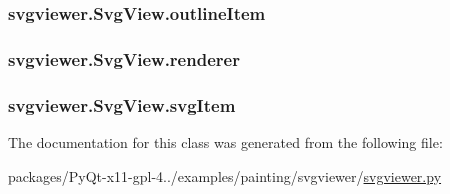 \subsubsection[{outline\+Item}]{\setlength{\rightskip}{0pt plus 5cm}svgviewer.\+Svg\+View.\+outline\+Item}\label{classsvgviewer_1_1SvgView_a85dfea1fa15b617175f3de8cd775ee19}
\hypertarget{classsvgviewer_1_1SvgView_a93df757fa1bb2c1f324c2c2e251dc291}{}
\subsubsection[{renderer}]{\setlength{\rightskip}{0pt plus 5cm}svgviewer.\+Svg\+View.\+renderer}\label{classsvgviewer_1_1SvgView_a93df757fa1bb2c1f324c2c2e251dc291}
\hypertarget{classsvgviewer_1_1SvgView_ad3102403b9614bc4ec39f81186e60892}{}
\subsubsection[{svg\+Item}]{\setlength{\rightskip}{0pt plus 5cm}svgviewer.\+Svg\+View.\+svg\+Item}\label{classsvgviewer_1_1SvgView_ad3102403b9614bc4ec39f81186e60892}


The documentation for this class was generated from the following file\+:\begin{DoxyCompactItemize}
\item 
packages/\+Py\+Qt-\/x11-\/gpl-\/4../examples/painting/svgviewer/\hyperlink{svgviewer_8py}{svgviewer.\+py}\end{DoxyCompactItemize}
